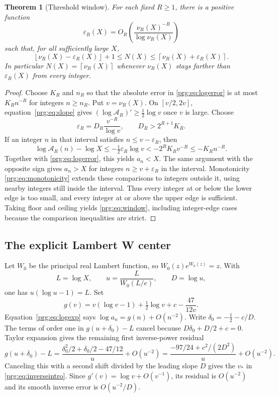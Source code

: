 \documentclass[11pt,letterpaper]{article}
\numberwithin{equation}{section}
\newtheorem{theorem}{Theorem}[section]
\theoremstyle{definition}\newtheorem{definition}[theorem]{Definition}
\theoremstyle{remark}\newtheorem{remark}[theorem]{Remark}
\newcommand{\eps}{\varepsilon}
\newcommand{\ceil}[1]{\left\lceil #1\right\rceil}
\newcommand{\floor}[1]{\left\lfloor #1\right\rfloor}
\begin{document}
\begin{theorem}[Threshold window]\label{prg:thm:threshold}
For each fixed $R\geq1$, there is a positive function
\[
 \eps_R(X)=O_R\left(\frac{\nu_R(X)^{-R}}{\log\nu_R(X)}\right)
\]
such that, for all sufficiently large $X$,
\begin{equation}\label{prg:eq:window}
 \floor{\nu_R(X)-\eps_R(X)}+1
       \leq N(X)\leq\ceil{\nu_R(X)+\eps_R(X)}.
\end{equation}
In particular $N(X)=\ceil{\nu_R(X)}$ whenever $\nu_R(X)$ stays
farther than $\eps_R(X)$ from every integer.
\end{theorem}
\begin{proof}
Choose $K_R$ and $n_R$ so that the absolute error in
\eqref{prg:eq:logerror} is at most $K_Rn^{-R}$ for integers $n\geq n_R$.
Put $v=\nu_R(X)$. On $[v/2,2v]$, equation~\eqref{prg:eq:slope} gives
$(\log\mathcal A_R)'\geq\frac12\log v$ once $v$ is large.
Choose
\[
 \eps_R=D_R\frac{v^{-R}}{\log v},\qquad D_R>2^{R+1}K_R.
\]
If an integer $n$ in that interval satisfies $n\leq v-\eps_R$,
then
\[
 \log\mathcal A_R(n)-\log X
 \leq-\tfrac12\eps_R\log v
 <-2^RK_Rv^{-R}\leq-K_Rn^{-R}.
\]
Together with \eqref{prg:eq:logerror}, this yields $a_n<X$.
The same argument with the opposite sign gives $a_n>X$ for
integers $n\geq v+\eps_R$ in the interval. Monotonicity
\eqref{prg:eq:monotonicity} extends these comparisons to integers
outside it, using nearby integers still inside the interval.
Thus every integer at or below the lower edge is too small, and
every integer at or above the upper edge is sufficient. Taking
floor and ceiling yields \eqref{prg:eq:window}, including integer-edge
cases because the comparison inequalities are strict.
\end{proof}

\subsection{The explicit Lambert W center}
Let $W_0$ be the principal real Lambert function, so
$W_0(z)e^{W_0(z)}=z$. With
\begin{equation}\label{prg:eq:u}
 L=\log X,\qquad u=\frac{L}{W_0(L/e)},\qquad D=\log u,
\end{equation}
one has $u(\log u-1)=L$. Set
\[
 g(v)=v(\log v-1)+\tfrac12\log v+c-\frac{47}{12v}.
\]
Equation~\eqref{prg:eq:logexp} says $\log a_n=g(n)+O(n^{-2})$.
Write $\delta_0=-\frac12-c/D$. The terms of order one in
$g(u+\delta_0)-L$ cancel because
$D\delta_0+D/2+c=0$. Taylor expansion gives the remaining first
inverse-power residual
\begin{equation}\label{prg:eq:residual}
 g(u+\delta_0)-L
 =\frac{\delta_0^2/2+\delta_0/2-47/12}{u}+O(u^{-2})
 =\frac{-97/24+c^2/(2D^2)}u+O(u^{-2}).
\end{equation}
Canceling this with a second shift divided by the leading slope
$D$ gives the $v_*$ in \eqref{prg:eq:inverseintro}. Since
$g'(v)=\log v+O(v^{-1})$, its residual is $O(u^{-2})$ and its
smooth inverse error is $O(u^{-2}/D)$.
\end{document}
